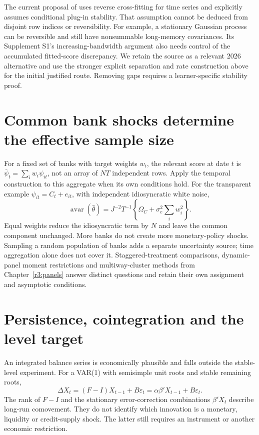 The current proposal of \citet[Assumptions 2.1--2.5]{ciganovic2026}
uses reverse cross-fitting for time series and explicitly assumes
conditional plug-in stability. That assumption cannot be deduced from
disjoint row indices or reversibility. For example, a stationary Gaussian
process can be reversible and still have nonsummable long-memory
covariances. Its Supplement S1's increasing-bandwidth argument also needs
control of the accumulated fitted-score discrepancy. We retain the source
as a relevant 2026 alternative and use the stronger explicit separation
and rate construction above for the initial justified route. Removing
gaps requires a learner-specific stability proof.

\section{Common bank shocks determine the effective sample size}
\label{s4:date-panel}
For a fixed set of banks with target weights $w_i$, the relevant score at
date $t$ is $\bar\psi_t=\sum_iw_i\psi_{it}$, not an array of $NT$
independent rows. Apply the temporal construction to this aggregate when
its own conditions hold. For the transparent example
$\psi_{it}=C_t+e_{it}$, with independent idiosyncratic white noise,
\[
 \operatorname{avar}(\widehat\theta)
 =J^{-2}T^{-1}\left\{\Omega_C+\sigma_e^2\sum_iw_i^2\right\}.
\]
Equal weights reduce the idiosyncratic term by $N$ and leave the common
component unchanged. More banks do not create more monetary-policy shocks.
Sampling a random population of banks adds a separate uncertainty source;
time aggregation alone does not cover it. Staggered-treatment comparisons,
dynamic-panel moment restrictions and multiway-cluster methods from
Chapter~\ref{r3:panels} answer distinct questions and retain their own
assignment and asymptotic conditions.

\section{Persistence, cointegration and the level target}
\label{s4:integrated-responses}
An integrated balance series is economically plausible and falls outside
the stable-level experiment. For a VAR(1) with semisimple unit roots and
stable remaining roots,
\[
 \Delta X_t=(F-I)X_{t-1}+B\varepsilon_t
             =\alpha\beta'X_{t-1}+B\varepsilon_t.
\]
The rank of $F-I$ and the stationary error-correction combinations
$\beta'X_t$ describe long-run comovement. They do not identify which
innovation is a monetary, liquidity or credit-supply shock. The latter
still requires an instrument or another economic restriction.

